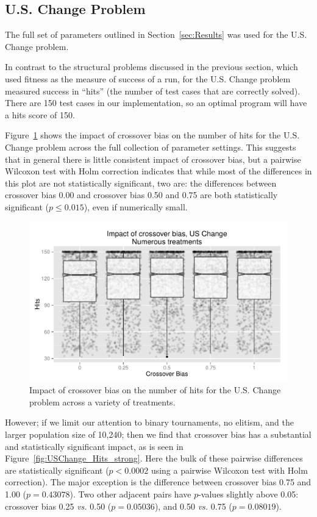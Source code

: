 \documentclass{sig-alternate}
\begin{document}
\subsection{U.S. Change Problem}

The full set of parameters outlined in Section~\ref{sec:Results} was used for the U.S. Change problem.

In contrast to the structural problems discussed in the previous section, which used fitness as the measure of success
of a run, for the U.S. Change problem measured success in ``hits'' (the number of test cases that are correctly
solved). There are 150 test cases in our implementation, so an optimal program will have a hits score of 150.

Figure~\ref{fig:USChange_Hits} shows the impact of crossover bias on the number of hits for the U.S. Change problem
across the full collection of parameter settings. This suggests that in general there is little consistent impact of
crossover bias, but a pairwise Wilcoxon test with Holm correction indicates that while most of the differences in this
plot are not statistically significant, two are: the differences between crossover bias 0.00 and crossover bias 0.50 and
0.75 are both statistically significant ($p \leq 0.015$), even if numerically small.

\begin{figure}
\centering
\includegraphics[width=0.45 \textwidth]{Plots/US_change_hits.pdf}
\caption{Impact of crossover bias on the number of hits for the U.S. Change problem across a variety of treatments.}
\label{fig:USChange_Hits}
\end{figure}

%
%
%
%

However; if we limit our attention to binary tournaments, no elitism, and the larger population size of 10,240; then we
find that crossover bias has a substantial and statistically significant impact, as is seen in
Figure~\ref{fig:USChange_Hits_strong}. Here the bulk of these pairwise differences are statistically significant
($p<0.0002$ using a pairwise Wilcoxon test with Holm correction). The major exception is the difference between
crossover bias 0.75 and 1.00 ($p=0.43078$). Two other adjacent pairs have $p$-values slightly above 0.05: crossover bias
0.25 \emph{vs.} 0.50 ($p=0.05036$), and 0.50 \emph{vs.} 0.75 ($p=0.08019$).
\end{document}
